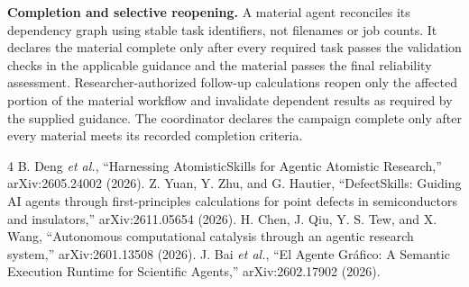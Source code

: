 \documentclass[aip,jap,reprint]{revtex4-2}
\begin{document}
\noindent\textbf{Completion and selective reopening.} A material agent reconciles its dependency graph using stable task identifiers, not filenames or job counts. It declares the material complete only after every required task passes the validation checks in the applicable guidance and the material passes the final reliability assessment. Researcher-authorized follow-up calculations reopen only the affected portion of the material workflow and invalidate dependent results as required by the supplied guidance. The coordinator declares the campaign complete only after every material meets its recorded completion criteria.

\begin{thebibliography}{4}
 B. Deng \textit{et al.}, ``Harnessing AtomisticSkills for Agentic Atomistic Research,'' arXiv:2605.24002 (2026).
 Z. Yuan, Y. Zhu, and G. Hautier, ``DefectSkills: Guiding AI agents through first-principles calculations for point defects in semiconductors and insulators,'' arXiv:2611.05654 (2026).
 H. Chen, J. Qiu, Y. S. Tew, and X. Wang, ``Autonomous computational catalysis through an agentic research system,'' arXiv:2601.13508 (2026).
 J. Bai \textit{et al.}, ``El Agente Gr\'afico: A Semantic Execution Runtime for Scientific Agents,'' arXiv:2602.17902 (2026).
\end{thebibliography}
\end{document}
